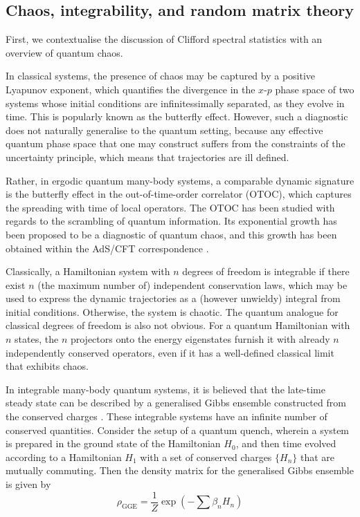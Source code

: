 \documentclass[10pt]{article}
\begin{document}
\subsection{Chaos, integrability, and random matrix theory}

First, we contextualise the discussion of Clifford spectral statistics with an overview of quantum chaos. 

In classical systems, the presence of chaos may be captured by a positive Lyapunov exponent, which quantifies the divergence in the $x$-$p$ phase space of two systems whose initial conditions are infinitessimally separated, as they evolve in time. This is popularly known as the butterfly effect. However, such a diagnostic does not naturally generalise to the quantum setting, because any effective quantum phase space that one may construct suffers from the constraints of the uncertainty principle, which means that trajectories are ill defined. 

Rather, in ergodic quantum many-body systems, a comparable dynamic signature is the butterfly effect in the out-of-time-order correlator (OTOC), which captures the spreading with time of local operators. The OTOC has been studied with regards to the scrambling of quantum information. Its exponential growth has been proposed to be a diagnostic of quantum chaos, and this growth has been obtained within the AdS/CFT correspondence \cite{nahum2018operator, von2018operator}.


Classically, a Hamiltonian system with $n$ degrees of freedom is integrable if there exist $n$ (the maximum number of) independent conservation laws, which may be used to express the dynamic trajectories as a (however unwieldy) integral from initial conditions. Otherwise, the system is chaotic. The quantum analogue for classical degrees of freedom is also not obvious. For a quantum Hamiltonian with $n$ states, the $n$ projectors onto the energy eigenstates furnish it with already $n$ independently conserved operators, even if it has a well-defined classical limit that exhibits chaos.

In integrable many-body quantum systems, it is believed that the late-time steady state can be described by a generalised Gibbs ensemble constructed from the conserved charges \cite{ilievski2015complete, calabrese2007quantum}. These integrable systems have an infinite number of conserved quantities. Consider the setup of a quantum quench, wherein a system is prepared in the ground state of the Hamiltonian $H_0$, and then time evolved according to a Hamiltonian $H_1$ with a set of conserved charges $\{H_n\}$ that are mutually commuting. Then the density matrix for the generalised Gibbs ensemble is given by
\begin{equation}
\rho_\text{GGE} = \frac{1}{Z} \exp\left(-\sum \beta_n H_n\right)
\end{equation}
\end{document}
